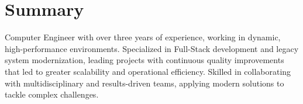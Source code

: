 \section{Summary}
	Computer Engineer with over three years of experience, working in dynamic, high-performance environments. Specialized in Full-Stack development and legacy system modernization, leading projects with continuous quality improvements that led to greater scalability and operational efficiency. Skilled in collaborating with multidisciplinary and results-driven teams, applying modern solutions to tackle complex challenges.